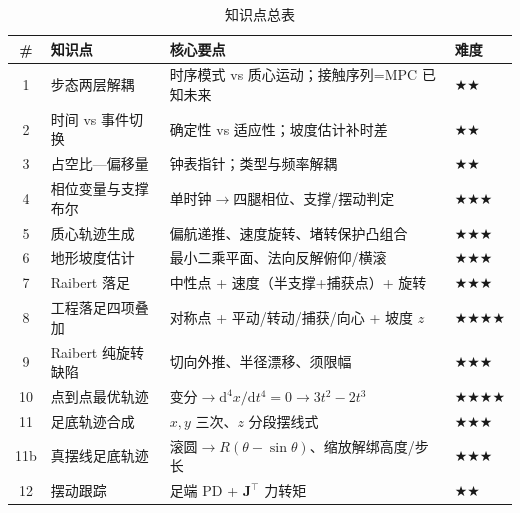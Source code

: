 \begin{table}[H]\centering\small
\caption{知识点总表}
\begin{tabular}{clll}
\toprule
\# & 知识点 & 核心要点 & 难度 \\
\midrule
1 & 步态两层解耦 & 时序模式 vs 质心运动；接触序列=MPC 已知未来 & \(\bigstar\bigstar\) \\
2 & 时间 vs 事件切换 & 确定性 vs 适应性；坡度估计补时差 & \(\bigstar\bigstar\) \\
3 & 占空比—偏移量 & 钟表指针；类型与频率解耦 & \(\bigstar\bigstar\) \\
4 & 相位变量与支撑布尔 & 单时钟$\to$四腿相位、支撑/摆动判定 & \(\bigstar\bigstar\bigstar\) \\
5 & 质心轨迹生成 & 偏航递推、速度旋转、堵转保护凸组合 & \(\bigstar\bigstar\bigstar\) \\
6 & 地形坡度估计 & 最小二乘平面、法向反解俯仰/横滚 & \(\bigstar\bigstar\bigstar\) \\
7 & Raibert 落足 & 中性点 + 速度（半支撑+捕获点）+ 旋转 & \(\bigstar\bigstar\bigstar\) \\
8 & 工程落足四项叠加 & 对称点 + 平动/转动/捕获/向心 + 坡度 $z$ & \(\bigstar\bigstar\bigstar\bigstar\) \\
9 & Raibert 纯旋转缺陷 & 切向外推、半径漂移、须限幅 & \(\bigstar\bigstar\bigstar\) \\
10 & 点到点最优轨迹 & 变分$\to\mathrm{d}^4x/\mathrm{d}t^4=0\to3t^2-2t^3$ & \(\bigstar\bigstar\bigstar\bigstar\) \\
11 & 足底轨迹合成 & $x,y$ 三次、$z$ 分段摆线式 & \(\bigstar\bigstar\bigstar\) \\
11b & 真摆线足底轨迹 & 滚圆$\to R(\theta-\sin\theta)$、缩放解绑高度/步长 & \(\bigstar\bigstar\bigstar\) \\
12 & 摆动跟踪 & 足端 PD + $\mathbf{J}^\top$ 力转矩 & \(\bigstar\bigstar\) \\
\bottomrule
\end{tabular}
\end{table}

